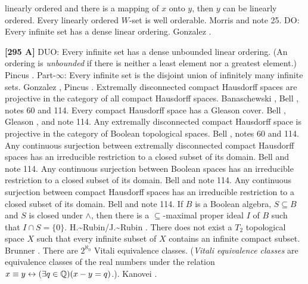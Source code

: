 linearly ordered and there is a mapping of $x$ onto $y$, then
$y$ can be linearly ordered.
\medskip
{}  Every linearly ordered $W$-set is well
orderable.  \ac{Morris} \cite{1969} and note 25.
\medskip
{}  DO:  Every infinite set has a dense linear
ordering.  \ac{Gonzalez} \cite{1995a}.
\smallskip
\item{}{\bf [295 A]} DUO: Every infinite set has a dense unbounded linear
ordering. (An ordering is {\it unbounded} if there is neither a least
element nor a greatest element.)  \ac{Pincus} \cite{1997}.
\medskip
{} Part-$\infty$: Every infinite set is the disjoint
union of infinitely many infinite sets.  \ac{Gonzalez} \cite{1995b},
\ac{Pincus} \cite{1997}.
\medskip
{} Extremally disconnected compact Hausdorff spaces
are projective in the category of all compact Hausdorff spaces.
\ac{Banaschewski} \cite{1988}, \ac{Bell} \cite{1988}, notes 60 and 114.
\medskip
{} Every compact Hausdorff space has a Gleason cover.
\ac{Bell} \cite{1988}, \ac{Gleason} \cite{1958}, and note 114.
\medskip
{} Any extremally disconnected compact Hausdorff
space is projective in the category of Boolean topological spaces.
\ac{Bell} \cite{1988}, notes 60 and 114.
\medskip
{} Any continuous surjection between extremally
disconnected compact Hausdorff spaces has an irreducible restriction to
a closed subset of its domain.  \ac{Bell} \cite{1988} and note 114.
\medskip
{} Any continuous surjection between Boolean spaces
has an irreducible restriction to a closed subset of its domain.
\ac{Bell} \cite{1988} and note 114.
\medskip
{} Any continuous surjection between compact
Hausdorff spaces has an irreducible restriction to a closed subset of
its domain.  \ac{Bell} \cite{1988} and note 114.
\medskip
{} If $B$ is a Boolean algebra, $S\subseteq B$ and
$S$ is closed under $\land$, then there is a $\subseteq$-maximal proper
ideal $I$ of $B$ such that $I\cap S= \{0\}$.  \ac{H.~Rubin/J.~Rubin}
\cite{1985}.
\medskip
{} There does not exist a $T_2$ topological space
$X$ such that every infinite subset of $X$ contains an infinite compact
subset. \ac{Brunner} \cite{1985c}.
\medskip
{} There are $2^{\aleph_0}$ Vitali equivalence
classes. ({\it Vitali equivalence classes} are equivalence classes of
the real numbers under the relation $x\equiv y\leftrightarrow(\exists
q\in{\Bbb Q})(x-y=q)$.). \ac{Kanovei} \cite{1991}.
